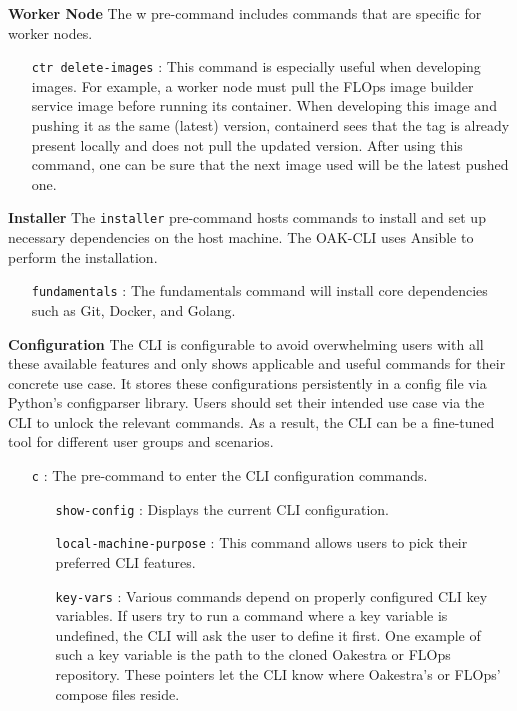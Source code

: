 \vspace{5mm}
\textbf{Worker Node}\newline
The w pre-command includes commands that are specific for worker nodes.
\begin{itemize}
    \item [\texttt{ctr delete-images}]:
        This command is especially useful when developing images.
        For example, a worker node must pull the FLOps image builder service image before running its container.
        When developing this image and pushing it as the same (latest) version, containerd sees that the tag is already present locally and does not pull the updated version.
        After using this command, one can be sure that the next image used will be the latest pushed one.
\end{itemize}
\vspace{5mm}
\textbf{Installer}\newline
The \texttt{installer} pre-command hosts commands to install and set up necessary dependencies on the host machine.
The OAK-CLI uses Ansible to perform the installation.
\begin{itemize}
    \item [\texttt{fundamentals}]:
        The fundamentals command will install core dependencies such as Git, Docker, and Golang.
\end{itemize}
\vspace{5mm}
\textbf{Configuration}\newline
The CLI is configurable to avoid overwhelming users with all these available features and only shows applicable and useful commands for their concrete use case.
It stores these configurations persistently in a config file via Python's configparser library.
Users should set their intended use case via the CLI to unlock the relevant commands.
As a result, the CLI can be a fine-tuned tool for different user groups and scenarios.
\begin{itemize}
    \item [\texttt{c}]:
        The pre-command to enter the CLI configuration commands.
        \begin{itemize}
            \item [\texttt{show-config}]:
                Displays the current CLI configuration.
            \item [\texttt{local-machine-purpose}]:
                This command allows users to pick their preferred CLI features.
            \item [\texttt{key-vars}]:
                Various commands depend on properly configured CLI key variables.
                If users try to run a command where a key variable is undefined, the CLI will ask the user to define it first.
                One example of such a key variable is the path to the cloned Oakestra or FLOps repository.
                These pointers let the CLI know where Oakestra's or FLOps' compose files reside.
        \end{itemize}
\end{itemize}
